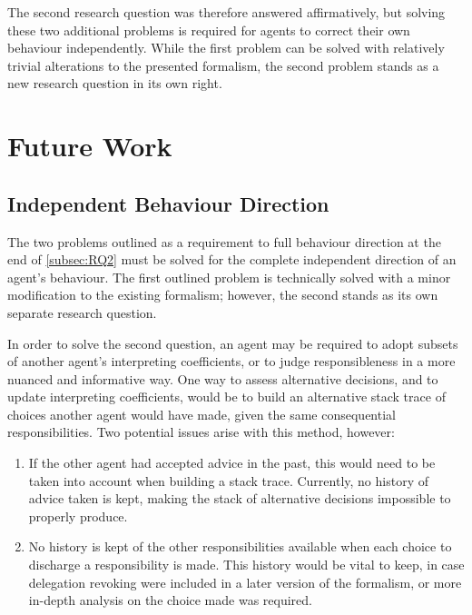 The second research question was therefore answered affirmatively, but solving these two additional problems is required for agents to correct their own behaviour independently. While the first problem can be solved with relatively trivial alterations to the presented formalism, the second problem stands as a new research question in its own right.\par

\section{Future Work}

\subsection{Independent Behaviour Direction}
The two problems outlined as a requirement to full behaviour direction at the end of \cref{subsec:RQ2} must be solved for the complete independent direction of an agent's behaviour. The first outlined problem is technically solved with a minor modification to the existing formalism; however, the second stands as its own separate research question.\par

In order to solve the second question, an agent may be required to adopt subsets of another agent's interpreting coefficients, or to judge responsibleness in a more nuanced and informative way. One way to assess alternative decisions, and to update interpreting coefficients, would be to build an alternative stack trace of choices another agent would have made, given the same consequential responsibilities. Two potential issues arise with this method, however:

\begin{enumerate}
    \item If the other agent had accepted advice in the past, this would need to be taken into account when building a stack trace. Currently, no history of advice taken is kept, making the stack of alternative decisions impossible to properly produce.\par
    \item No history is kept of the other responsibilities available when each choice to discharge a responsibility is made. This history would be vital to keep, in case delegation revoking were included in a later version of the formalism, or more in-depth analysis on the choice made was required.\par
\end{enumerate}

